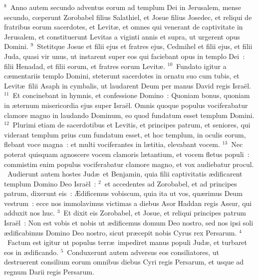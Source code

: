 ${}^{8}$~Anno autem secundo adventus eorum ad templum Dei in Jerusalem, mense secundo, cœperunt Zorobabel filius Salathiel, et Josue filius Josedec, et reliqui de fratribus eorum sacerdotes, et Levit\ae , et omnes qui venerant de captivitate in Jerusalem, et constituerunt Levitas a viginti annis et supra, ut urgerent opus Domini.
${}^{9}$~Stetitque Josue et filii ejus et fratres ejus, Cedmihel et filii ejus, et filii Juda, quasi vir unus, ut instarent super eos qui faciebant opus in templo Dei~: filii Henadad, et filii eorum, et fratres eorum Levit\ae .
${}^{10}$~Fundato igitur a c\ae mentariis templo Domini, steterunt sacerdotes in ornatu suo cum tubis, et Levit\ae\ filii Asaph in cymbalis, ut laudarent Deum per manus David regis Isra\"el.
${}^{11}$~Et concinebant in hymnis, et confessione Domino~: Quoniam bonus, quoniam in \ae ternum misericordia ejus super Isra\"el. Omnis quoque populus vociferabatur clamore magno in laudando Dominum, eo quod fundatum esset templum Domini.
${}^{12}$~Plurimi etiam de sacerdotibus et Levitis, et principes patrum, et seniores, qui viderant templum prius cum fundatum esset, et hoc templum, in oculis eorum, flebant voce magna~: et multi vociferantes in l\ae titia, elevabant vocem.
${}^{13}$~Nec poterat quisquam agnoscere vocem clamoris l\ae tantium, et vocem fletus populi~: commistim enim populus vociferabatur clamore magno, et vox audiebatur procul.
~Audierunt autem hostes Jud\ae\ et Benjamin, quia filii captivitatis \ae dificarent templum Domino Deo Isra\"el~:
${}^{2}$~et accedentes ad Zorobabel, et ad principes patrum, dixerunt eis~: \AE dificemus vobiscum, quia ita ut vos, qu\ae rimus Deum vestrum~: ecce nos immolavimus victimas a diebus Asor Haddan regis Assur, qui adduxit nos huc.
${}^{3}$~Et dixit eis Zorobabel, et Josue, et reliqui principes patrum Isra\"el~: Non est vobis et nobis ut \ae dificemus domum Deo nostro, sed nos ipsi soli \ae dificabimus Domino Deo nostro, sicut pr\ae cepit nobis Cyrus rex Persarum.
${}^{4}$~Factum est igitur ut populus terr\ae\ impediret manus populi Jud\ae , et turbaret eos in \ae dificando.
${}^{5}$~Conduxerunt autem adversus eos consiliatores, ut destruerent consilium eorum omnibus diebus Cyri regis Persarum, et usque ad regnum Darii regis Persarum.


